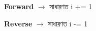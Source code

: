 \begin{rememberbox}

\begin{center}

\textbf{Forward}
\(\longrightarrow\)
সাধারণত
\textenglish{\ttfamily i += 1}

\qquad

\textbf{Reverse}
\(\longrightarrow\)
সাধারণত
\textenglish{\ttfamily i -= 1}

\end{center}

\end{rememberbox}



